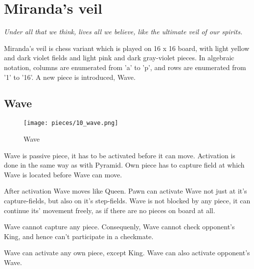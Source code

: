 
\chapter*{Miranda's veil}

\begin{flushright}
\parbox{0.8\textwidth}{
\emph{Under all that we think, lives all we believe, like the ultimate veil of our spirits. \\
 } }
\end{flushright}

\noindent
Miranda's veil is chess variant which is played on 16 x 16 board,
with light yellow and dark violet fields and light pink and dark
gray-violet pieces. In algebraic notation, columns are enumerated
from 'a' to 'p', and rows are enumerated from '1' to '16'. A new
piece is introduced, Wave.

\clearpage %

\section*{Wave}

\noindent
\begin{wrapfigure}[12]{l}{0.4\textwidth}
\texttt{[image: pieces/10\_wave.png]}
\caption{Wave}
\label{fig:wave}
\end{wrapfigure}
Wave is passive piece, it has to be activated before it can move.
Activation is done in the same way as with Pyramid. Own piece
has to capture field at which Wave is located before Wave can
move.

After activation Wave moves like Queen. Pawn can activate Wave
not just at it's capture-fields, but also on it's step-fields.
Wave is not blocked by any piece, it can continue its' movement
freely, as if there are no pieces on board at all.

Wave cannot capture any piece. Consequenly, Wave cannot check
opponent's King, and hence can't participate in a checkmate.

Wave can activate any own piece, except King. Wave can also
activate opponent's Wave.

